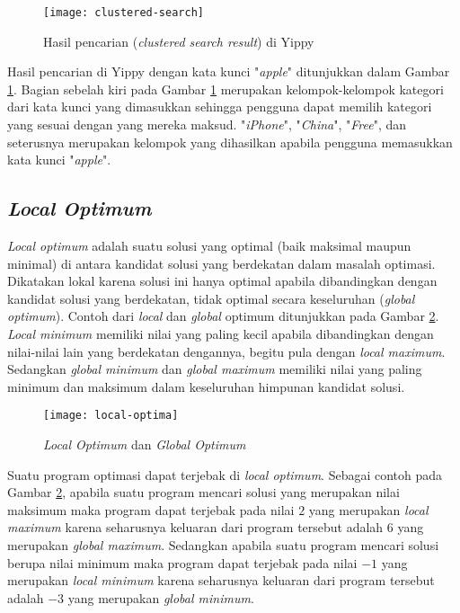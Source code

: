 \begin{figure}[h]
	\centering
	\texttt{[image: clustered-search]}
	\caption{Hasil pencarian (\textit{clustered search result}) di Yippy}
	\label{fig:yippy}
\end{figure}

Hasil pencarian di Yippy dengan kata kunci "\textit{apple}" ditunjukkan dalam Gambar \ref{fig:yippy}. Bagian sebelah kiri pada Gambar \ref{fig:yippy} merupakan kelompok-kelompok kategori dari kata kunci yang dimasukkan sehingga pengguna dapat memilih kategori yang sesuai dengan yang mereka maksud. "\textit{iPhone}", "\textit{China}", "\textit{Free}", dan seterusnya merupakan kelompok yang dihasilkan apabila pengguna memasukkan kata kunci "\textit{apple}".

\subsection{\textit{Local Optimum}}
\textit{Local optimum} adalah suatu solusi yang optimal (baik maksimal maupun minimal) di antara kandidat solusi yang berdekatan dalam masalah optimasi. Dikatakan lokal karena solusi ini hanya optimal apabila dibandingkan dengan kandidat solusi yang berdekatan, tidak optimal secara keseluruhan (\textit{global optimum}). Contoh dari \textit{local} dan \textit{global} optimum ditunjukkan pada Gambar \ref{fig:optima}. \textit{Local minimum} memiliki nilai yang paling kecil apabila dibandingkan dengan nilai-nilai lain yang berdekatan dengannya, begitu pula dengan \textit{local maximum}. Sedangkan \textit{global minimum} dan \textit{global maximum} memiliki nilai yang paling minimum dan maksimum dalam keseluruhan himpunan kandidat solusi.

\begin{figure}[h]
	\begin{center}
		\texttt{[image: local-optima]}
		\caption{\textit{Local Optimum} dan \textit{Global Optimum}}
		\label{fig:optima}
	\end{center}
\end{figure}

Suatu program optimasi dapat terjebak di \textit{local optimum}. Sebagai contoh pada Gambar \ref{fig:optima}, apabila suatu program mencari solusi yang merupakan nilai maksimum maka program dapat terjebak pada nilai $2$ yang merupakan \textit{local maximum} karena seharusnya keluaran dari program tersebut adalah $6$ yang merupakan \textit{global maximum}. Sedangkan apabila suatu program mencari solusi berupa nilai minimum maka program dapat terjebak pada nilai $-1$ yang merupakan \textit{local minimum} karena seharusnya keluaran dari program tersebut adalah $-3$ yang merupakan \textit{global minimum}.


